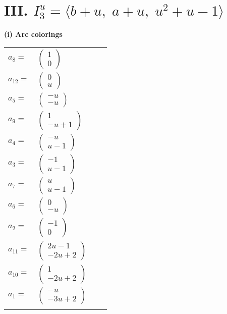 \documentclass[1p]{elsarticle_modified}
\theoremstyle{definition}
\begin{document}
\centering \section*{III. $I^u_{3}= \langle b+u,\;a+u,\;u^2+u-1 \rangle$}
\flushleft \textbf{(i) Arc colorings}\\
\begin{tabular}{m{7pt} m{180pt} m{7pt} m{180pt} }
\flushright $a_{8}=$&$\begin{pmatrix}1\\0\end{pmatrix}$ \\
\flushright $a_{12}=$&$\begin{pmatrix}0\\u\end{pmatrix}$ \\
\flushright $a_{5}=$&$\begin{pmatrix}- u\\- u\end{pmatrix}$ \\
\flushright $a_{9}=$&$\begin{pmatrix}1\\- u+1\end{pmatrix}$ \\
\flushright $a_{4}=$&$\begin{pmatrix}- u\\u-1\end{pmatrix}$ \\
\flushright $a_{3}=$&$\begin{pmatrix}-1\\u-1\end{pmatrix}$ \\
\flushright $a_{7}=$&$\begin{pmatrix}u\\u-1\end{pmatrix}$ \\
\flushright $a_{6}=$&$\begin{pmatrix}0\\- u\end{pmatrix}$ \\
\flushright $a_{2}=$&$\begin{pmatrix}-1\\0\end{pmatrix}$ \\
\flushright $a_{11}=$&$\begin{pmatrix}2 u-1\\-2 u+2\end{pmatrix}$ \\
\flushright $a_{10}=$&$\begin{pmatrix}1\\-2 u+2\end{pmatrix}$ \\
\flushright $a_{1}=$&$\begin{pmatrix}- u\\-3 u+2\end{pmatrix}$\\&\end{tabular}
\end{document}
